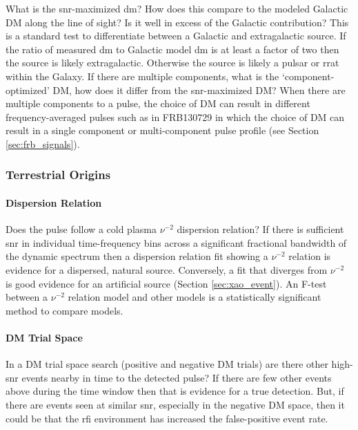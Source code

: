 \documentclass[a4paper,fleqn,usenatbib]{mnras}
\begin{document}
What is the \gls{snr}-maximized \gls{dm}? How does this compare to the modeled
Galactic DM along the line of sight? Is it well in excess of the Galactic
contribution? This is a standard test to differentiate between a Galactic and
extragalactic source. If the ratio of measured \gls{dm} to Galactic model
\gls{dm} is at least a factor of two then the source is likely extragalactic.
Otherwise the source is likely a pulsar or \gls{rrat} within the Galaxy.  If
there are multiple components, what is the `component-optimized' DM, how does it
differ from the \gls{snr}-maximized DM? When there are multiple components to a
pulse, the choice of DM can result in different frequency-averaged pulses such
as in FRB130729 in which the choice of DM can result in a single component or
multi-component pulse profile (see Section \ref{sec:frb_signals}).

\subsubsection{Terrestrial Origins}

\paragraph{Dispersion Relation}

Does the pulse follow a cold plasma $\nu^{-2}$ dispersion relation? If there is
sufficient \gls{snr} in individual time-frequency bins across a significant
fractional bandwidth of the dynamic spectrum then a dispersion relation fit
showing a $\nu^{-2}$ relation is evidence for a dispersed, natural source.
Conversely, a fit that diverges from $\nu^{-2}$ is good evidence for an
artificial source (Section \ref{sec:xao_event}). An F-test between a $\nu^{-2}$
relation model and other models is a statistically significant method to compare
models.

\paragraph{DM Trial Space}

In a DM trial space search (positive and negative DM trials) are there other
high-\gls{snr} events nearby in time to the detected pulse? If there are few
other events above during the time window then that is evidence for a true
detection. But, if there are events seen at similar \gls{snr}, especially in the
negative DM space, then it could be that the \gls{rfi} environment has
increased the false-positive event rate.
\end{document}
